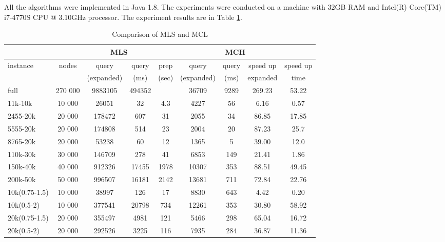 
All the algorithms were implemented in Java 1.8. The experiments were conducted on a machine with 
32GB RAM and Intel(R) Core(TM) i7-4770S CPU @ 3.10GHz processor. The experiment results are in Table \ref{result}. 

\begin{table}[h]
\tiny
\caption{Comparison of MLS and MCL}
\label{result}
\begin{tabular}{l|c|cc|ccccc}
 & & \multicolumn{2}{c}{MLS} & \multicolumn{5}{c}{MCH} \\ \cline{3-6} \hline
instance & nodes & query & query & prep & query & query & speed up & speed up \\ \hline
& & (expanded) & (ms) & (sec) & (expanded) & (ms) & expanded & time \\ \hline
full & 270 000 & 9883105 & 494352 & & 36709 & 9289 & 269.23 & 53.22  \\ \hline
11k-10k & 10 000 & 26051 & 32 & 4.3 & 4227 & 56 & 6.16 & 0.57 \\ \hline
2455-20k & 20 000 & 178472 & 607 & 31 & 2055 & 34 & 86.85 & 17.85 \\ \hline
5555-20k & 20 000 & 174808 & 514 & 23 & 2004 & 20 & 87.23 & 25.7 \\ \hline
8765-20k & 20 000 & 53238 & 60 & 12 & 1365 & 5 & 39.00 & 12.0 \\ \hline
110k-30k & 30 000 & 146709 & 278 & 41 & 6853 & 149 & 21.41 & 1.86 \\ \hline
150k-40k & 40 000 & 912326 & 17455 & 1978 & 10307 & 353 & 88.51& 49.45 \\ \hline
200k-50k & 50 000 & 996507 & 16181 & 2142 & 13681 & 711 & 72.84& 22.76 \\ \hline
10k(0.75-1.5) & 10 000  & 38997 & 126 & 17 & 8830 & 643 & 4.42 & 0.20 \\ \hline
10k(0.5-2) & 10 000     & 377541 & 20798 & 734 & 12261 & 353 & 30.80 & 58.92 \\ \hline
20k(0.75-1.5) & 20 000 & 355497 & 4981 & 121 & 5466 & 298 & 65.04 & 16.72 \\ \hline
20k(0.5-2) & 20 000    & 292526 & 3225 & 116 & 7935 & 284 & 36.87 & 11.36 \\ \hline
\end{tabular}
\end{table}

